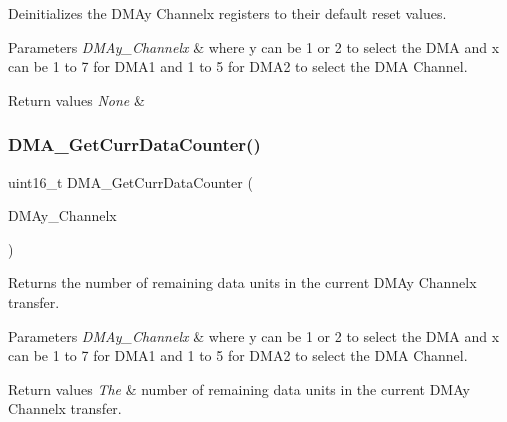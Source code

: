Deinitializes the D\+M\+Ay Channelx registers to their default reset values. 


\begin{DoxyParams}{Parameters}
{\em D\+M\+Ay\+\_\+\+Channelx} & where y can be 1 or 2 to select the D\+MA and x can be 1 to 7 for D\+M\+A1 and 1 to 5 for D\+M\+A2 to select the D\+MA Channel. \\
\hline
\end{DoxyParams}

\begin{DoxyRetVals}{Return values}
{\em None} & \\
\hline
\end{DoxyRetVals}
\mbox{\label{group___d_m_a___private___functions_ga511b4c402d1ff32d53f28736956cac5d}} 
\subsubsection{\texorpdfstring{DMA\_GetCurrDataCounter()}{DMA\_GetCurrDataCounter()}}
{\footnotesize\ttfamily uint16\+\_\+t D\+M\+A\+\_\+\+Get\+Curr\+Data\+Counter (\begin{DoxyParamCaption}\item[{\mbox{\hyperlink{struct_d_m_a___channel___type_def}{D\+M\+A\+\_\+\+Channel\+\_\+\+Type\+Def}} $\ast$}]{D\+M\+Ay\+\_\+\+Channelx }\end{DoxyParamCaption})}



Returns the number of remaining data units in the current D\+M\+Ay Channelx transfer. 


\begin{DoxyParams}{Parameters}
{\em D\+M\+Ay\+\_\+\+Channelx} & where y can be 1 or 2 to select the D\+MA and x can be 1 to 7 for D\+M\+A1 and 1 to 5 for D\+M\+A2 to select the D\+MA Channel. \\
\hline
\end{DoxyParams}

\begin{DoxyRetVals}{Return values}
{\em The} & number of remaining data units in the current D\+M\+Ay Channelx transfer. \\
\hline
\end{DoxyRetVals}
\mbox{\label{group___d_m_a___private___functions_gafb30b7a891834c267eefd5d30b688a9f}} 
